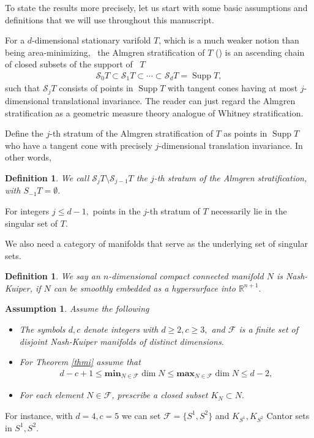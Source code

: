 \documentclass[11pt,a4paper]{amsart}
\numberwithin{equation}{section}
\newcommand{\supp}{\operatorname{Supp}}
\newcommand{\mff}{\mathcal{F}}
\newcommand{\cd}{\cdots}
\newcommand{\s}{\subset}
\newcommand{\R}{\mathbb{R}}
\theoremstyle{plain}
\newtheorem{assump}[exam]{Assumption}
\newtheorem{defn}[exam]{Definition}
\theoremstyle{definition}
\numberwithin{equation}{subsection}
\begin{document}
	
	To state the results more precisely, let us start with some basic assumptions and definitions that we will use throughout this manuscript.
	
	For a $d$-dimensional stationary varifold $T$, which is a much weaker notion than being area-minimizing,  the Almgren stratification of $ T$ (\cite{BWst}) is an ascending chain of closed subsets of the support of  $T$
	\begin{align*}
		\mathcal{S}_0T\s\mathcal{{S}}_1T\s\cd\s\mathcal{S}_dT=\supp T,\end{align*}
	such that $\mathcal{S}_j T$ consists of points in $\supp T$ with tangent cones having at most $j$-dimensional translational invariance. The reader can just regard the Almgren stratification as a geometric measure theory analogue of Whitney stratification. 
	
	
	Define the $j$-th stratum of the Almgren stratification of $T$ as points in $\supp T$ who have a tangent cone with precisely $j$-dimensional translation invariance. In other words,
	\begin{defn}
		We call $\mathcal{S}_jT\setminus\mathcal{S}_{j-1}T$ the $j$-th stratum of the Almgren stratification, with $S_{-1}T=\emptyset.$
	\end{defn}
	For integers $j\le d-1,$ points in the $j$-th stratum of $T$ necessarily lie in the singular set of $T.$ 
	
	We also need a category of manifolds that serve as the underlying set of singular sets.
	\begin{defn}\label{defnnk}
		We say an $n$-dimensional compact connected manifold $N$ is Nash-Kuiper, if $N$ can be smoothly embedded as a hypersurface into $\R^{n+1}.$
	\end{defn}%
	\begin{assump}\label{assumpmff}Assume the following
		\begin{itemize}
			\item	The symbols $d,c$ denote integers with $d\ge2,c\ge 3,$ and $\mff$ is a finite set of disjoint Nash-Kuiper manifolds of distinct dimensions.
			\item For Theorem \ref{thmi} assume that
			\begin{align*}
				d-c+1\le\mathbf{min}_{N\in \mff}\dim N\le\mathbf{max}_{N\in \mff}\dim N\le d-2,	
			\end{align*}
			\item For each element $N\in \mff$, prescribe a closed subset $K_N\s N.$
		\end{itemize}
	\end{assump}
	For instance, with $d=4,c=5$ we can set $\mff=\{S^1,S^2\}$ and $K_{S^1},K_{S^2}$ Cantor sets in $S^1,S^2.$ 
	
\end{document}
